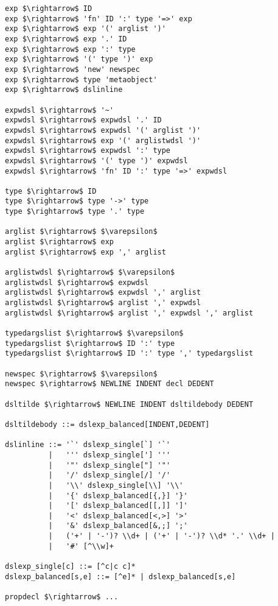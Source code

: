 \begin{lstlisting}[mathescape]
exp $\rightarrow$ ID
exp $\rightarrow$ 'fn' ID ':' type '=>' exp
exp $\rightarrow$ exp '(' arglist ')'
exp $\rightarrow$ exp '.' ID
exp $\rightarrow$ exp ':' type
exp $\rightarrow$ '(' type ')' exp
exp $\rightarrow$ 'new' newspec
exp $\rightarrow$ type 'metaobject'
exp $\rightarrow$ dslinline

expwdsl $\rightarrow$ '~'
expwdsl $\rightarrow$ expwdsl '.' ID
expwdsl $\rightarrow$ expwdsl '(' arglist ')'
expwdsl $\rightarrow$ exp '(' arglistwdsl ')'
expwdsl $\rightarrow$ expwdsl ':' type
expwdsl $\rightarrow$ '(' type ')' expwdsl
expwdsl $\rightarrow$ 'fn' ID ':' type '=>' expwdsl
        
type $\rightarrow$ ID
type $\rightarrow$ type '->' type
type $\rightarrow$ type '.' type

arglist $\rightarrow$ $\varepsilon$
arglist $\rightarrow$ exp
arglist $\rightarrow$ exp ',' arglist

arglistwdsl $\rightarrow$ $\varepsilon$
arglistwdsl $\rightarrow$ expwdsl
arglistwdsl $\rightarrow$ expwdsl ',' arglist
arglistwdsl $\rightarrow$ arglist ',' expwdsl
arglistwdsl $\rightarrow$ arglist ',' expwdsl ',' arglist

typedargslist $\rightarrow$ $\varepsilon$
typedargslist $\rightarrow$ ID ':' type
typedargslist $\rightarrow$ ID ':' type ',' typedargslist

newspec $\rightarrow$ $\varepsilon$
newspec $\rightarrow$ NEWLINE INDENT decl DEDENT

dsltilde $\rightarrow$ NEWLINE INDENT dsltildebody DEDENT

dsltildebody ::= dslexp_balanced[INDENT,DEDENT]

dslinline ::= '`' dslexp_single[`] '`'
          |   ''' dslexp_single['] '''
          |   '"' dslexp_single["] '"'
          |   '/' dslexp_single[/] '/'
          |   '\\' dslexp_single[\\] '\\'
          |   '{' dslexp_balanced[{,}] '}'
          |   '[' dslexp_balanced[[,]] ']'
          |   '<' dslexp_balanced[<,>] '>'
          |   '&' dslexp_balanced[&,;] ';'
          |   ('+' | '-')? \\d+ | ('+' | '-')? \\d* '.' \\d+ |
          |   '#' [^\\w]+

dslexp_single[c] ::= [^c|c c]*
dslexp_balanced[s,e] ::= [^e]* | dslexp_balanced[s,e]

propdecl $\rightarrow$ ...
\end{lstlisting}


